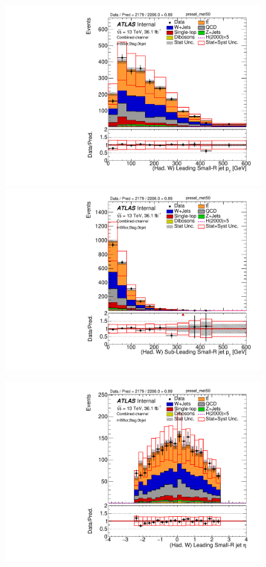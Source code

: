  
\begin{figure}[!ht]
\begin{center}
\includegraphics[scale=0.33]{./figures/boosted/PlotsInMbbCR/DataMC_2tag_0bjet_mbbcr_lepton_presel_met50_LightJet1Pt}
\includegraphics[scale=0.33]{./figures/boosted/PlotsInMbbCR/DataMC_2tag_0bjet_mbbcr_lepton_presel_met50_LightJet2Pt}\\
\par\medskip
\includegraphics[scale=0.33]{./figures/boosted/PlotsInMbbCR/DataMC_2tag_0bjet_mbbcr_lepton_presel_met50_LightJet1Eta}

\end{center}
\end{figure}

